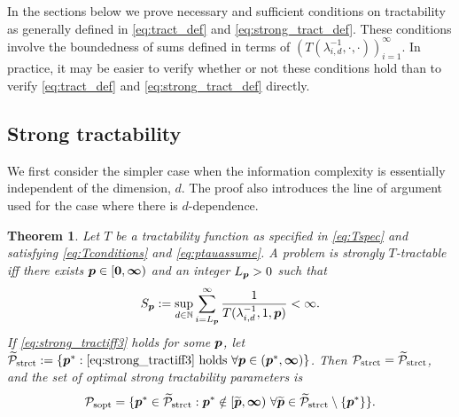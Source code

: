 \documentclass[sort&compress]{elsarticle}
\newtheorem{theorem}{Theorem}
\begin{document}
In the sections below we prove necessary and sufficient conditions on tractability as generally defined in \eqref{eq:tract_def} and \eqref{eq:strong_tract_def}.  These conditions involve the boundedness of sums defined in terms of $(T(\lambda_{i,d}^{-1},\cdot, \cdot))_{i=1}^\infty$.  In practice, it may be easier to verify whether or not these conditions hold than to verify \eqref{eq:tract_def} and \eqref{eq:strong_tract_def} directly.




\subsection{Strong tractability}

We first consider the simpler case when the information complexity is essentially independent of the dimension, $d$.  The proof also introduces the line of argument used for the case where there is $d$-dependence.

\begin{theorem}\label{thm_main_strong_tract2}
Let $T$ be a tractability function as specified in \eqref{eq:Tspec} and satisfying \eqref{eq:Tconditions} and \eqref{eq:ptauassume}.  A problem is strongly $T$-tractable iff there exists $\boldsymbol{p} \in [\boldsymbol{0}, \boldsymbol{\infty})$ and an integer $L_{\boldsymbol{p}} > 0$ such that
\begin{equation} \label{eq:strong_tractiff3}
     S_{\boldsymbol{p}}:=\sup_{d \in \mathbb{N}} \sum_{i = L_{\boldsymbol{p}}}^\infty \frac{1}{T(\lambda_{i,d}^{-1},1,\boldsymbol{p})} < \infty.
\end{equation}
If \eqref{eq:strong_tractiff3} holds for some $\boldsymbol{p}$, let  $\widetilde{\mathcal{P}}_{\textup{strct}} : = \{\boldsymbol{p}^* : \eqref{eq:strong_tractiff3} \text{ holds }\forall \boldsymbol{p} \in (\boldsymbol{p}^*,\boldsymbol{\infty})\}$.  Then $\mathcal{P}_{\textup{strct}} = \widetilde{\mathcal{P}}_{\textup{strct}}$, and the set of optimal strong tractability parameters is
\[
	\mathcal{P}_{\textup{sopt}} =
	\{\boldsymbol{p}^* \in \widetilde{\mathcal{P}}_{\textup{strct}} :  \boldsymbol{p}^* \notin [\widetilde{\boldsymbol{p}},\boldsymbol{\infty}) \ \forall \widetilde{\boldsymbol{p}}\in  \widetilde{\mathcal{P}}_{\textup{strct}} \setminus \{\boldsymbol{p}^*\} \}.
\]
\end{theorem}
\end{document}

